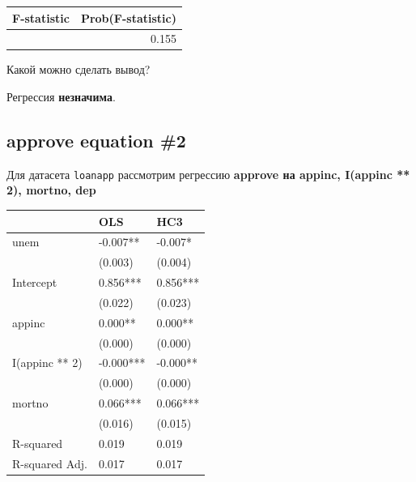 \documentclass[
  russian,
]{article}
\newcounter{none} %
\begin{document}
{\def\LTcaptype{none} %
\begin{longtable}[]{@{}rr@{}}
\toprule\noalign{}
F-statistic & Prob(F-statistic) \\
\midrule\noalign{}
\endhead
\bottomrule\noalign{}
\endlastfoot
1.667 & 0.155 \\
\end{longtable}
}

Какой можно сделать вывод?

\begin{tcolorbox}[enhanced jigsaw, arc=.35mm, bottomrule=.15mm, bottomtitle=1mm, breakable, colback=white, colbacktitle=quarto-callout-important-color!10!white, colframe=quarto-callout-important-color-frame, coltitle=black, left=2mm, leftrule=.75mm, opacityback=0, opacitybacktitle=0.6, rightrule=.15mm, title=\textcolor{quarto-callout-important-color}{\faExclamation}\hspace{0.5em}{Вывод}, titlerule=0mm, toprule=.15mm, toptitle=1mm]

Регрессия \textbf{незначима}.

\end{tcolorbox}

\subsection{approve equation \#2}\label{approve-equation-2-2}

Для датасета \texttt{loanapp} рассмотрим регрессию \textbf{approve на
appinc, I(appinc ** 2), mortno, dep}

{\def\LTcaptype{none} %
\begin{longtable}[]{@{}lll@{}}
\toprule\noalign{}
& OLS & HC3 \\
\midrule\noalign{}
\endhead
\bottomrule\noalign{}
\endlastfoot
unem & -0.007** & -0.007* \\
& (0.003) & (0.004) \\
Intercept & 0.856*** & 0.856*** \\
& (0.022) & (0.023) \\
appinc & 0.000** & 0.000** \\
& (0.000) & (0.000) \\
I(appinc ** 2) & -0.000*** & -0.000** \\
& (0.000) & (0.000) \\
mortno & 0.066*** & 0.066*** \\
& (0.016) & (0.015) \\
R-squared & 0.019 & 0.019 \\
R-squared Adj. & 0.017 & 0.017 \\
\end{longtable}
}
\end{document}
